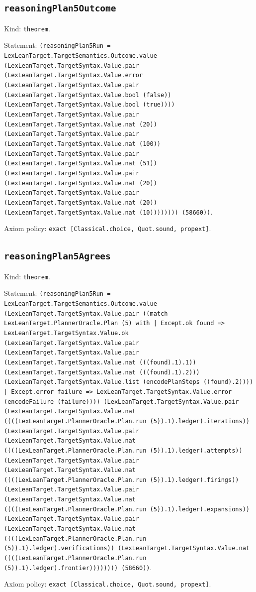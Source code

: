\documentclass[11pt]{article}
\begin{document}
\subsection*{\texttt{reasoningPlan5Outcome}}
\noindent Kind: \texttt{theorem}.\par
\noindent Statement: \texttt{(reasoningPlan5Run = LexLeanTarget.TargetSemantics.Outcome.value (LexLeanTarget.TargetSyntax.Value.pair (LexLeanTarget.TargetSyntax.Value.error (LexLeanTarget.TargetSyntax.Value.pair (LexLeanTarget.TargetSyntax.Value.bool (false)) (LexLeanTarget.TargetSyntax.Value.bool (true)))) (LexLeanTarget.TargetSyntax.Value.pair (LexLeanTarget.TargetSyntax.Value.nat (20)) (LexLeanTarget.TargetSyntax.Value.pair (LexLeanTarget.TargetSyntax.Value.nat (100)) (LexLeanTarget.TargetSyntax.Value.pair (LexLeanTarget.TargetSyntax.Value.nat (51)) (LexLeanTarget.TargetSyntax.Value.pair (LexLeanTarget.TargetSyntax.Value.nat (20)) (LexLeanTarget.TargetSyntax.Value.pair (LexLeanTarget.TargetSyntax.Value.nat (20)) (LexLeanTarget.TargetSyntax.Value.nat (10)))))))) (58660))}.\par
\noindent Axiom policy: \texttt{exact [Classical.choice, Quot.sound, propext]}.\par
\subsection*{\texttt{reasoningPlan5Agrees}}
\noindent Kind: \texttt{theorem}.\par
\noindent Statement: \texttt{(reasoningPlan5Run = LexLeanTarget.TargetSemantics.Outcome.value (LexLeanTarget.TargetSyntax.Value.pair ((match LexLeanTarget.PlannerOracle.Plan (5) with | Except.ok found => LexLeanTarget.TargetSyntax.Value.ok (LexLeanTarget.TargetSyntax.Value.pair (LexLeanTarget.TargetSyntax.Value.pair (LexLeanTarget.TargetSyntax.Value.nat (((found).1).1)) (LexLeanTarget.TargetSyntax.Value.nat (((found).1).2))) (LexLeanTarget.TargetSyntax.Value.list (encodePlanSteps ((found).2)))) | Except.error failure => LexLeanTarget.TargetSyntax.Value.error (encodeFailure (failure)))) (LexLeanTarget.TargetSyntax.Value.pair (LexLeanTarget.TargetSyntax.Value.nat ((((LexLeanTarget.PlannerOracle.Plan.run (5)).1).ledger).iterations)) (LexLeanTarget.TargetSyntax.Value.pair (LexLeanTarget.TargetSyntax.Value.nat ((((LexLeanTarget.PlannerOracle.Plan.run (5)).1).ledger).attempts)) (LexLeanTarget.TargetSyntax.Value.pair (LexLeanTarget.TargetSyntax.Value.nat ((((LexLeanTarget.PlannerOracle.Plan.run (5)).1).ledger).firings)) (LexLeanTarget.TargetSyntax.Value.pair (LexLeanTarget.TargetSyntax.Value.nat ((((LexLeanTarget.PlannerOracle.Plan.run (5)).1).ledger).expansions)) (LexLeanTarget.TargetSyntax.Value.pair (LexLeanTarget.TargetSyntax.Value.nat ((((LexLeanTarget.PlannerOracle.Plan.run (5)).1).ledger).verifications)) (LexLeanTarget.TargetSyntax.Value.nat ((((LexLeanTarget.PlannerOracle.Plan.run (5)).1).ledger).frontier)))))))) (58660))}.\par
\noindent Axiom policy: \texttt{exact [Classical.choice, Quot.sound, propext]}.\par
\end{document}
